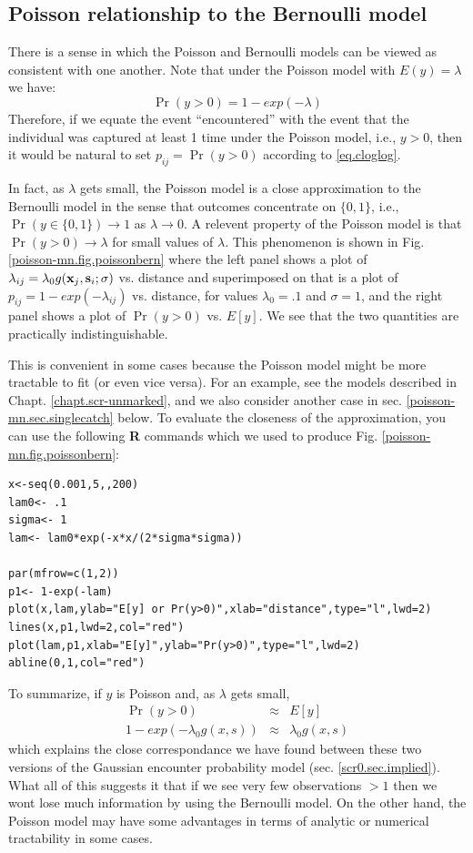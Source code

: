 \subsection{Poisson relationship to the Bernoulli model}

There is a sense in which the Poisson and Bernoulli models can
be viewed as consistent with one another. Note that under the Poisson
model with $E(y) = \lambda$ we have:
\begin{equation}
 \Pr(y>0) = 1-exp(-\lambda)
\label{eq.cloglog}
\end{equation}
Therefore, if we equate the event ``encountered'' with the event that
the individual was captured at least 1 time under the Poisson model,
i.e., $y>0$, then it would be natural to set $p_{ij} = \Pr(y>0)$
according to \ref{eq.cloglog}.

In fact, as $\lambda$ gets small, the Poisson model is a close approximation
to the Bernoulli model in the sense that outcomes concentrate on
$\{0,1\}$, i.e.,  $\Pr(y\in \{0,1\})
\rightarrow 1$ as $\lambda \rightarrow 0$.
A relevent property of the Poisson model
is that
$\Pr(y>0) \rightarrow \lambda$
for small values of $\lambda$.
This phenomenon is shown in  Fig.
\ref{poisson-mn.fig.poissonbern} where
the left panel shows a plot of $\lambda_{ij}=\lambda_{0}g({\bf
  x}_{j},{\bf s}_{i};\sigma)$ vs. distance and
superimposed on that is a plot of $p_{ij}=1-exp(-\lambda_{ij})$ vs. distance, for values
$\lambda_{0} = .1$ and $\sigma = 1$, and the right panel shows a plot of
$\Pr(y>0)$ vs. $E[y]$. We see that the two quantities are
practically indistinguishable.

This is
convenient in some cases because the Poisson model might be more
tractable to fit (or even vice versa). For an example, see the models
described in Chapt. \ref{chapt.scr-unmarked}, and we also consider
another case in sec. \ref{poisson-mn.sec.singlecatch} below. To
evaluate the closeness of the approximation, you can use the following
{\bf R} commands which we used to produce
Fig. \ref{poisson-mn.fig.poissonbern}:
{\small
\begin{verbatim}
x<-seq(0.001,5,,200)
lam0<- .1
sigma<- 1
lam<- lam0*exp(-x*x/(2*sigma*sigma))

par(mfrow=c(1,2))
p1<- 1-exp(-lam)
plot(x,lam,ylab="E[y] or Pr(y>0)",xlab="distance",type="l",lwd=2)
lines(x,p1,lwd=2,col="red")
plot(lam,p1,xlab="E[y]",ylab="Pr(y>0)",type="l",lwd=2)
abline(0,1,col="red")
\end{verbatim}
}

To summarize, if $y$ is Poisson and, as $\lambda$ gets small,
\begin{eqnarray*}
\Pr(y>0)  & \approx & E[y]  \\
1-exp(-\lambda_{0} g(x,s)) &\approx &  \lambda_{0} g(x,s)
\end{eqnarray*}
which explains the close correspondance we have found between these
two versions of the Gaussian encounter probability model (sec. \ref{scr0.sec.implied}).
What all of this suggests it that
if we see very few observations $>1$ then we wont lose much
information by using the Bernoulli model. On the other hand, the
Poisson model may have some advantages in terms of analytic or numerical
tractability in some cases.

